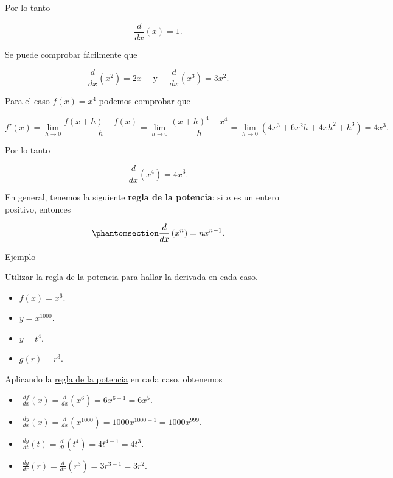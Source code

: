 \documentclass[
  letterpaper,
]{book}
\theoremstyle{plain}
\theoremstyle{remark}
\begin{document}
Por lo tanto

\[
\frac{d}{dx}(x)=1.
\]

Se puede comprobar fácilmente que

\[
\frac{d}{dx}\left(x^2\right)=2x \quad \text { y } \quad \frac{d}{dx}\left(x^3\right)=3x^2. 
\]

Para el caso \(f(x)=x^4\) podemos comprobar que

\[
f'(x)=\lim_{h\to 0} \frac{f(x+h)-f(x)}{h}=\lim_{h\to 0} \frac{(x+h)^4-x^4}{h}=\lim_{h\to 0}\left(4x^3+6x^2h+4xh^2+h^3\right)=4x^3.
\]

Por lo tanto

\[
\frac{d}{dx}\left(x^4\right)=4x^3.
\]

En general, tenemos la siguiente \textbf{regla de la potencia}: si \(n\)
es un entero positivo, entonces

\begin{equation}\phantomsection\label{eq-regla-potencia}{
\frac{d}{dx}\left(x^n\right)=nx^{n-1}.
}\end{equation}

Ejemplo

Utilizar la regla de la potencia para hallar la derivada en cada caso.

\begin{itemize}
\item
  \(f(x)=x^6\).
\item
  \(y=x^{1000}\).
\end{itemize}

\begin{itemize}
\item
  \(y=t^4\).
\item
  \(g(r)=r^3\).
\end{itemize}

\begin{tcolorbox}[enhanced jigsaw, opacityback=0, left=2mm, opacitybacktitle=0.6, toprule=.15mm, bottomrule=.15mm, colbacktitle=quarto-callout-tip-color!10!white, titlerule=0mm, bottomtitle=1mm, title=\textcolor{quarto-callout-tip-color}{\faLightbulb}\hspace{0.5em}{Solución}, toptitle=1mm, colframe=quarto-callout-tip-color-frame, colback=white, breakable, rightrule=.15mm, arc=.35mm, leftrule=.75mm, coltitle=black]

Aplicando la \hyperref[eq-regla-potencia]{regla de la potencia} en cada
caso, obtenemos

\begin{itemize}
\item
  \(\,\,\displaystyle \frac{df}{dx}(x)=\frac{d}{dx}(x^6)=6x^{6-1}=6x^5\).
\item
  \(\,\,\displaystyle \frac{dy}{dx}(x)=\frac{d}{dx}(x^1000)=1000x^{1000-1}=1000x^999\).
\item
  \(\,\,\displaystyle \frac{dy}{dt}(t)=\frac{d}{dt}(t^4)=4t^{4-1}=4t^3\).
\item
  \(\,\,\displaystyle \frac{dg}{dr}(r)=\frac{d}{dr}(r^3)=3r^{3-1}=3r^2\).
\end{itemize}

\end{tcolorbox}
\end{document}
